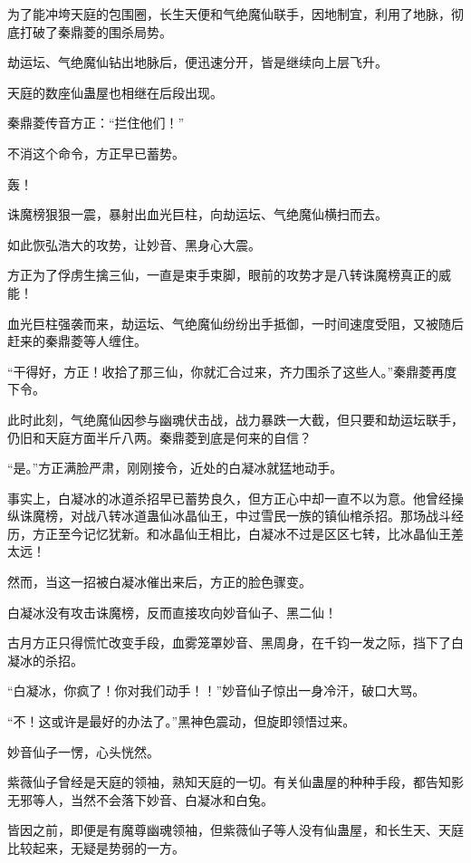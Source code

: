 
\begin{this_body}

为了能冲垮天庭的包围圈，长生天便和气绝魔仙联手，因地制宜，利用了地脉，彻底打破了秦鼎菱的围杀局势。

劫运坛、气绝魔仙钻出地脉后，便迅速分开，皆是继续向上层飞升。

天庭的数座仙蛊屋也相继在后段出现。

秦鼎菱传音方正：“拦住他们！”

不消这个命令，方正早已蓄势。

轰！

诛魔榜狠狠一震，暴射出血光巨柱，向劫运坛、气绝魔仙横扫而去。

如此恢弘浩大的攻势，让妙音、黑身心大震。

方正为了俘虏生擒三仙，一直是束手束脚，眼前的攻势才是八转诛魔榜真正的威能！

血光巨柱强袭而来，劫运坛、气绝魔仙纷纷出手抵御，一时间速度受阻，又被随后赶来的秦鼎菱等人缠住。

“干得好，方正！收拾了那三仙，你就汇合过来，齐力围杀了这些人。”秦鼎菱再度下令。

此时此刻，气绝魔仙因参与幽魂伏击战，战力暴跌一大截，但只要和劫运坛联手，仍旧和天庭方面半斤八两。秦鼎菱到底是何来的自信？

“是。”方正满脸严肃，刚刚接令，近处的白凝冰就猛地动手。

事实上，白凝冰的冰道杀招早已蓄势良久，但方正心中却一直不以为意。他曾经操纵诛魔榜，对战八转冰道蛊仙冰晶仙王，中过雪民一族的镇仙棺杀招。那场战斗经历，方正至今记忆犹新。和冰晶仙王相比，白凝冰不过是区区七转，比冰晶仙王差太远！

然而，当这一招被白凝冰催出来后，方正的脸色骤变。

白凝冰没有攻击诛魔榜，反而直接攻向妙音仙子、黑二仙！

古月方正只得慌忙改变手段，血雾笼罩妙音、黑周身，在千钧一发之际，挡下了白凝冰的杀招。

“白凝冰，你疯了！你对我们动手！！”妙音仙子惊出一身冷汗，破口大骂。

“不！这或许是最好的办法了。”黑神色震动，但旋即领悟过来。

妙音仙子一愣，心头恍然。

紫薇仙子曾经是天庭的领袖，熟知天庭的一切。有关仙蛊屋的种种手段，都告知影无邪等人，当然不会落下妙音、白凝冰和白兔。

皆因之前，即便是有魔尊幽魂领袖，但紫薇仙子等人没有仙蛊屋，和长生天、天庭比较起来，无疑是势弱的一方。


\end{this_body}
